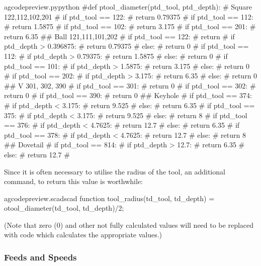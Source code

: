 \documentclass{ltxdoc}
\begin{document}
\lstset{firstnumber=\thegcpy}
\begin{writecode}{a}{gcodepreview.py}{python}
#def ptool_diameter(ptd_tool, ptd_depth):
# Square 122,112,102,201
#    if ptd_tool == 122:
#        return 0.79375
#    if ptd_tool == 112:
#        return 1.5875
#    if ptd_tool == 102:
#        return 3.175
#    if ptd_tool == 201:
#        return 6.35
## Ball 121,111,101,202
#    if ptd_tool == 122:
#        return 
#        if ptd_depth > 0.396875:
#            return 0.79375
#        else:
#            return 0
#    if ptd_tool == 112:
#        if ptd_depth > 0.79375:
#            return 1.5875
#        else:
#            return 0
#    if ptd_tool == 101:
#        if ptd_depth > 1.5875:
#            return 3.175
#        else:
#            return 0
#    if ptd_tool == 202:
#        if ptd_depth > 3.175:
#            return 6.35
#        else:
#            return 0
## V 301, 302, 390
#    if ptd_tool == 301:
#        return 0
#    if ptd_tool == 302:
#        return 0
#    if ptd_tool == 390:
#        return 0
## Keyhole
#    if ptd_tool == 374:
#        if ptd_depth < 3.175:
#            return 9.525
#        else:
#            return 6.35
#    if ptd_tool == 375:
#        if ptd_depth < 3.175:
#            return 9.525
#        else:
#            return 8
#    if ptd_tool == 376:
#        if ptd_depth < 4.7625:
#            return 12.7
#        else:
#            return 6.35
#    if ptd_tool == 378:
#        if ptd_depth < 4.7625:
#            return 12.7
#        else:
#            return 8
## Dovetail
#    if ptd_tool == 814:
#        if ptd_depth > 12.7:
#            return 6.35
#        else:
#            return 12.7
#
\end{writecode}
\addtocounter{gcpy}{67}

Since it is often necessary to utilise the radius of the tool, an additional command,  to return this value is worthwhile:
 
\lstset{firstnumber=\thegcpscad}
\begin{writecode}{a}{gcodepreview.scad}{scad}
function tool_radius(td_tool, td_depth) = otool_diameter(td_tool, td_depth)/2;

\end{writecode}
\addtocounter{gcpscad}{2}
 
(Note that zero (0) and other not fully calculated values will need to be replaced with code which calculates the appropriate values.)

\subsubsection{Feeds and Speeds}
\end{document}
